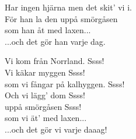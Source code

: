 Har ingen hjärna men det skit' vi i.\\
För han la den uppå smörgåsen\\
som han åt med laxen...\\
...och det gör han varje dag.\par
\vspace{7pt}
Vi kom från Norrland. Ssss!\\
Vi käkar myggen Ssss!\\
som vi fångar på kalhyggen. Ssss!\\
Och vi lägg' dom Ssss!\\
uppå smörgåsen Ssss!\\
som vi ät' med laxen...\\
...och det gör vi varje daaag!
